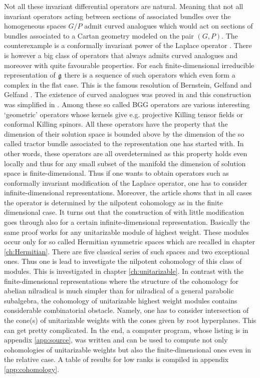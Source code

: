 Not all these invariant differential operators are natural. Meaning that not all invariant operators acting between sections of associated bundles over the homogeneous spaces $G/P$ admit curved analogues which would act on sections of bundles associated to a Cartan geometry modeled on the pair $(G, P)$. The counterexample is a conformally invariant power of the Laplace operator \cite{graham_conformally_1992, gover_conformally_2004}. There is however a big class of operators that always admits curved analogues and moreover with quite favourable properties. For each finite-dimensional irreducible representation of $\mathfrak{g}$ there is a sequence of such operators which even form a complex in the flat case. This is the famous resolution of Bernstein, Gelfand and Gelfand \cite{bernstein_differential_1975}. The existence of curved analogues was proved in \cite{cap_bernstein-gelfand-gelfand_2001} and this construction was simplified in \cite{calderbank_differential_2001}. Among these so called BGG operators are various interesting `geometric' operators whose kernels give e.g. projective Killing tensor fields or conformal Killing spinors. All these operators have the property that the dimension of their solution space is bounded above by the dimension of the so called tractor bundle associated to the representation one has started with. In other words, these operators are all overdetermined as this property holds even locally and thus for any small subset of the manifold the dimension of solution space is finite-dimensional. Thus if one wants to obtain operators such as conformally invariant modification of the Laplace operator, one has to consider infinite-dimensional representations. Moreover, the article \cite{shaynkman_unfolded_2006} shows that in all cases the operator is determined by the nilpotent cohomology as in the finite dimensional case. It turns out that the construction of \cite{calderbank_differential_2001} with little modification goes through also for a certain infinite-dimensional representation. Basically the same proof works for any unitarizable module of highest weight. These modules occur only for so called Hermitian symmetric spaces which are recalled in chapter \ref{ch:Hermitian}. There are five classical series of such spaces and two exceptional ones. Thus one is lead to investigate the nilpotent cohomology of this class of modules. This is investigated in chapter \ref{ch:unitarizable}. In contrast with the finite-dimensional representations where the structure of the cohomology for abelian nilradical is much simpler than for nilradical of a general parabolic subalgebra, the cohomology of unitarizable highest weight modules contains considerable combinatorial obstacle. Namely, one has to consider intersection of the cone(s) of unitarizable weights with the cones given by root hyperplanes. This can get pretty complicated. In the end, a computer program, whose listing is in appendix \ref{app:source}, was written and can be used to compute not only cohomologies of unitarizable weights but also the finite-dimensional ones even in the relative case. A table of results for low ranks is compiled in appendix \ref{app:cohomology}.


